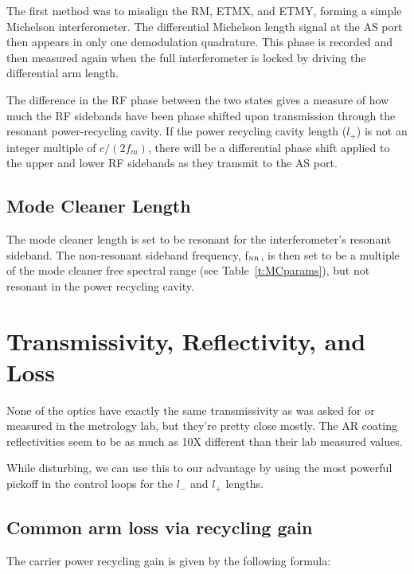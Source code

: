 The first method was to misalign the RM, ETMX, and ETMY, forming a simple
Michelson interferometer. The differential Michelson length signal at the
AS port then appears in only one demodulation quadrature. This phase is
recorded and then measured again when the full interferometer is locked by
driving the differential arm length. 

The difference in the RF phase between
the two states gives a measure of how much the RF sidebands have been phase
shifted upon transmission through the resonant power-recycling cavity.
If the power recycling cavity length ($l_+$) is not an integer multiple
of $c/(2 f_m)$, there will be a differential phase shift applied to
the upper and lower RF sidebands as they transmit to the AS port.



\subsection{Mode Cleaner Length}

The mode cleaner length is set to be resonant for the interferometer's
resonant sideband. The non-resonant sideband frequency, f$_{\mbox{\tiny NR}}$, is then
set to be a multiple of the mode cleaner free spectral range
(see Table~\ref{t:MCparams}), but not resonant in the power recycling
cavity.



\section{Transmissivity, Reflectivity, and Loss}

None of the optics have exactly the same transmissivity as was asked for 
or measured in the metrology lab, but they're pretty close mostly. The
AR coating reflectivities seem to be as much as 10X different than their
lab measured values.

While disturbing, we can use this to our advantage by using the most
powerful pickoff in the control loops for the $l_-$ and $l_+$
lengths.

\subsection{Common arm loss via recycling gain}

The carrier power recycling gain is given by the following formula:

